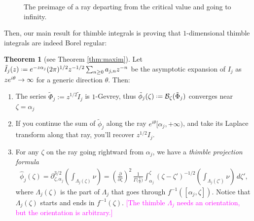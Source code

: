 \documentclass{article}
\let\Re\relax
\DeclareMathOperator{\Re}{Re}
\theoremstyle{definition}
\newcommand{\fracderiv}[3]{\partial^{#1}_{#2, #3}}
\newcommand*{\defeq}{\mathrel{\vcenter{\baselineskip0.5ex \lineskiplimit0pt
                     \hbox{\scriptsize.}\hbox{\scriptsize.}}}%
                     =}
\newcommand{\borel}{\mathcal{B}}
\newtheorem{theorem}{Theorem}[section]
\begin{document}
\begin{figure}[ht]
    \centering
    \caption{The preimage of a ray departing from the critical value and going to infinity.}
    \label{fig:thimble_vs_rays}
\end{figure}
Then, our main result for thimble integrals is proving that $1$-dimensional thimble integrals are indeed Borel regular:
\begin{theorem}[see Theorem \ref{thm:maxim}]
    Let $\tilde{I}_{j}(z)\defeq e^{-z \alpha_j}(2\pi)^{1/2} z^{-1/2} \sum_{n\geq 0}a_{j,n}z^{-n}$ be the asymptotic expansion of $I_j$ as $\Re z e^{i\theta}\to \infty$ for a generic direction $\theta$. Then:
\begin{enumerate}
\item The series $\tilde{\Phi}_j:=z^{1/2} \tilde{I}_j$ is $1$-Gevrey, thus $\tilde{\phi}_j(\zeta)\defeq\borel_\zeta(\tilde{\Phi}_j)$ converges near $\zeta=\alpha_j$
\item If you continue the sum of $\tilde{\phi}_j$ along the ray $ e^{i\theta}[\alpha_j,+\infty)$, and take its Laplace transform along that ray, you'll recover $z^{1/2} I_j$.
\item\label{part3} For any $\zeta$ on the ray going rightward from $\alpha_j$, we have a \textit{thimble projection formula}
\begin{multline}\label{eqn:formula}
\hat{\phi}_{j}(\zeta)=\fracderiv{3/2}{\zeta}{\alpha_j} \left( \int_{\Lambda_j(\zeta)}\nu \right)=\left(\tfrac{\partial}{\partial \zeta}\right)^2\,\frac{1}{\Gamma\big(\tfrac{1}{2}\big)} \int_{\alpha_j}^\zeta (\zeta-\zeta')^{-1/2}\left( \int_{\Lambda_j(\zeta')} \nu \right)\,d\zeta',
\end{multline}
where $\Lambda_j(\zeta)$ is the part of $\Lambda_j$ that goes through $f^{-1}([\alpha_j, \zeta])$. Notice that $\Lambda_j(\zeta)$ starts and ends in $f^{-1}(\zeta)$. \textcolor{magenta}{[The thimble $\Lambda_j$ needs an orientation, but the orientation is arbitrary.]}
\end{enumerate}
\end{theorem}
\end{document}
